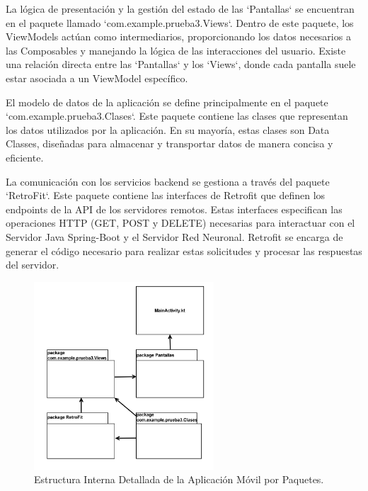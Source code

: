 La lógica de presentación y la gestión del estado de las `Pantallas` se encuentran en el paquete llamado `com.example.prueba3.Views`. Dentro de este paquete, los ViewModels actúan como intermediarios, proporcionando los datos necesarios a las Composables y manejando la lógica de las interacciones del usuario. Existe una relación directa entre las `Pantallas` y los `Views`, donde cada pantalla suele estar asociada a un ViewModel específico. 

El modelo de datos de la aplicación se define principalmente en el paquete `com.example.prueba3.Clases`. Este paquete contiene las clases que representan los datos utilizados por la aplicación. En su mayoría, estas clases son Data Classes, diseñadas para almacenar y transportar datos de manera concisa y eficiente.

La comunicación con los servicios backend se gestiona a través del paquete `RetroFit`. Este paquete contiene las interfaces de Retrofit que definen los endpoints de la API de los servidores remotos. Estas interfaces especifican las operaciones HTTP (GET, POST y DELETE) necesarias para interactuar con el Servidor Java Spring-Boot y el Servidor Red Neuronal. Retrofit se encarga de generar el código necesario para realizar estas solicitudes y procesar las respuestas del servidor.

\newpage

\begin{figure}[htbp!]
	\begin{center}
		\includegraphics[width=0.6\textwidth]{DiagramasMoviles/DCM (1)}
		\caption{Estructura Interna Detallada de la Aplicación Móvil por Paquetes.}
		\label{fig:Diagrama_app_movil_detallado}
	\end{center}
\end{figure}



